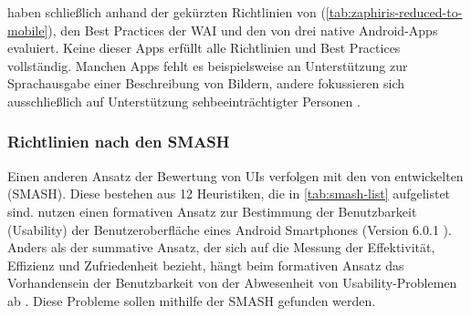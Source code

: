 \citeauthor{Diaz-Bossini:2014:Accessibility-to-Mobile-Interfaces} haben schließlich anhand der gekürzten Richtlinien von \citeauthor{Zaphiris:2005:Age-Centered-Research-Based-Web-Design} (\autoref{tab:zaphiris-reduced-to-mobile}), den Best Practices der \ac{WAI} \cite{Web-Accessibility-Initiative::Older-Users-and-Web-Accessibility:}\cite{Diaz-Bossini:2014:Accessibility-to-Mobile-Interfaces} und den  von \textcite{Google-Inc.::Android-Accessibility-Practices} drei native Android-Apps evaluiert. Keine dieser Apps erfüllt alle Richtlinien und Best Practices vollständig. Manchen Apps fehlt es beispielsweise an Unterstützung zur Sprachausgabe einer Beschreibung von Bildern, andere fokussieren sich ausschließlich auf Unterstützung sehbeeinträchtigter Personen \cite{Diaz-Bossini:2014:Accessibility-to-Mobile-Interfaces}.

\subsubsection{Richtlinien nach den SMASH}

Einen anderen Ansatz der Bewertung von \aclp{UI} verfolgen \textcite{Salman:2018:Usability-Evaluation-of-the-Smartphone}mit den von \textcite{Inostroza:2016:Developing-SMASH:-A-set-of-SMArtphones} entwickelten  (\acs{SMASH}). Diese bestehen aus 12 Heuristiken, die in \autoref{tab:smash-list} aufgelistet sind. \citeauthor{Salman:2018:Usability-Evaluation-of-the-Smartphone} nutzen einen formativen Ansatz zur Bestimmung der Benutzbarkeit (Usability) der Benutzeroberfläche eines Android Smartphones (Version 6.0.1 ). Anders als der summative Ansatz, der sich auf die Messung der Effektivität, Effizienz und Zufriedenheit bezieht, hängt beim formativen Ansatz das Vorhandensein der Benutzbarkeit von der Abwesenheit von Usability-Problemen ab \cite{Lewis:2014:Usability:-Lessons-Learned}. Diese Probleme sollen mithilfe der \ac{SMASH} gefunden werden.

